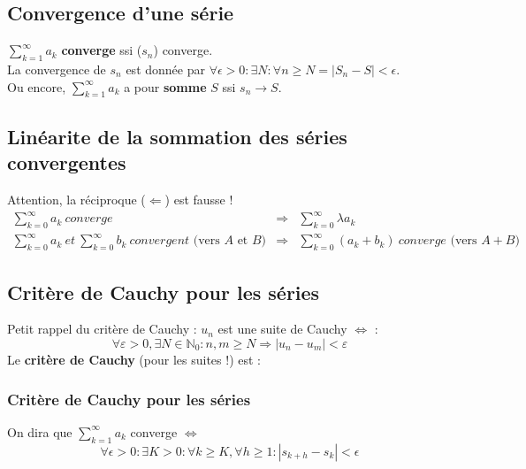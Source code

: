\documentclass[11pt, a4paper, openany]{book}
\begin{document}
\setcounter{subsection}{3}
\subsection{Convergence d'une série}
$\sum_{k=1}^\infty a_k$ \textbf{converge} ssi ($s_n$) converge.\\
La convergence de $s_n$ est donnée par $\forall \epsilon > 0 : \exists N : \forall n \geq N = |S_n - S| < \epsilon$.\\
Ou encore, $\sum_{k=1}^\infty a_k$ a pour \textbf{somme} $S$ ssi $s_n \rightarrow S$.
		
\setcounter{subsection}{5}
\subsection{Linéarite de la sommation des séries convergentes}
Attention, la réciproque ($\Leftarrow$) est fausse ! 
\begin{eqnarray}
	\sum_{k=0}^\infty a_k\ converge\ &\Rightarrow & \sum_{k=0}^\infty \lambda a_k\\
	\sum_{k=0}^\infty a_k\ et\ \sum_{k=0}^\infty b_k\ convergent \text{ (vers $A$ et $B$)} & \Rightarrow & \sum_{k=0}^\infty (a_k + b_k)\ converge\text{ (vers $A+B$)}
\end{eqnarray}
		
\subsection{Critère de Cauchy pour les séries}
Petit rappel du critère de Cauchy : $u_n$ est une suite de Cauchy $\Leftrightarrow$ :
\begin{equation}
	\forall \varepsilon > 0, \exists N \in \mathbb{N}_0 : n,m \geq N \Rightarrow |u_n - u_m| < \varepsilon
\end{equation}
Le \textbf{critère de Cauchy} (pour les suites !) est : \\
		
\subsubsection{Critère de Cauchy pour les séries}
On dira que $\sum_{k=1}^\infty a_k$ converge $\Leftrightarrow$
\begin{equation}
	\forall \epsilon > 0 : \exists K > 0 : \forall k \geq K, \forall h \geq 1 : |s_{k+h} - s_k| < \epsilon
\end{equation}
		
\end{document}
